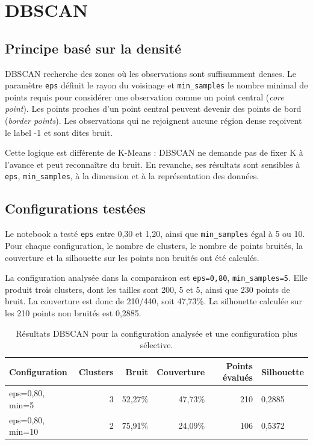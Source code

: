 \chapter{DBSCAN}

\section{Principe basé sur la densité}
DBSCAN recherche des zones où les observations sont suffisamment denses. Le paramètre \texttt{eps} définit le rayon du voisinage et \texttt{min\_samples} le nombre minimal de points requis pour considérer une observation comme un point central (\textit{core point}). Les points proches d'un point central peuvent devenir des points de bord (\textit{border points}). Les observations qui ne rejoignent aucune région dense reçoivent le label -1 et sont dites bruit.

Cette logique est différente de K-Means : DBSCAN ne demande pas de fixer K à l'avance et peut reconnaître du bruit. En revanche, ses résultats sont sensibles à \texttt{eps}, \texttt{min\_samples}, à la dimension et à la représentation des données.

\section{Configurations testées}
Le notebook a testé \texttt{eps} entre 0,30 et 1,20, ainsi que \texttt{min\_samples} égal à 5 ou 10. Pour chaque configuration, le nombre de clusters, le nombre de points bruités, la couverture et la silhouette sur les points non bruités ont été calculés.

La configuration analysée dans la comparaison est \texttt{eps=0,80}, \texttt{min\_samples=5}. Elle produit trois clusters, dont les tailles sont 200, 5 et 5, ainsi que 230 points de bruit. La couverture est donc de 210/440, soit 47,73\%. La silhouette calculée sur les 210 points non bruités est 0,2885.

\begin{table}[H]
\centering
\caption{Résultats DBSCAN pour la configuration analysée et une configuration plus sélective.}
\label{tab:dbscan}
\scriptsize
\begin{tabularx}{\textwidth}{lrrrrX}
\toprule
Configuration & Clusters & Bruit & Couverture & Points évalués & Silhouette \\
\midrule
eps=0,80, min=5 & 3 & 52,27\% & 47,73\% & 210 & 0,2885 \\
eps=0,80, min=10 & 2 & 75,91\% & 24,09\% & 106 & 0,5372 \\
\bottomrule
\end{tabularx}
\end{table}

